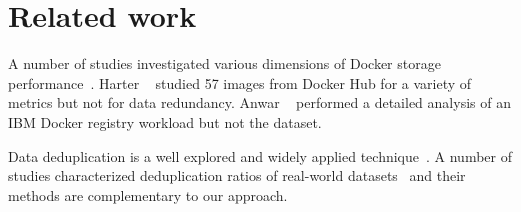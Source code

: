 \section{Related work}
\label{sec:related}


A number of studies investigated various dimensions of Docker storage
performance~\cite{dockerssd,shifter,slacker,exoclones,docker-driver-eval,
improve-cow-container-drivers,cntr}.
%
Harter \etal~\cite{slacker} studied 57 images from Docker Hub for a variety of metrics
but not for data redundancy.
%
%
%
Anwar \etal~\cite{dockerworkload} performed a detailed analysis
of an IBM Docker registry workload but not the dataset.

%
%
%
Data deduplication is a well
explored and widely applied technique~\cite{2009-sparse_indexing_inline_dedup_using_sampling-fast,
2001-low_bandwidth_network_fs-sosp,
2012-idedup-fast,
tarasov2014dmdedup,
2008-avoid_disk_bottleneck_data_domain_dedupfs-fast}.
%
A number of studies characterized deduplication ratios of
real-world datasets~\cite{2009-dedup_effectiveness_on_vm_disk_images-systor,
2012-data_reduction_in_primary_storage-systor,
2012-hpc_practical_dedup_study-sc,
2013-charact_increment_changes_data_protect-atc,
msst16dedup-study,
2012-charact_backup_workloads-fast,
2013-charact_dedup_effic_big_data-iiswc}
 and their methods are complementary to our approach.


